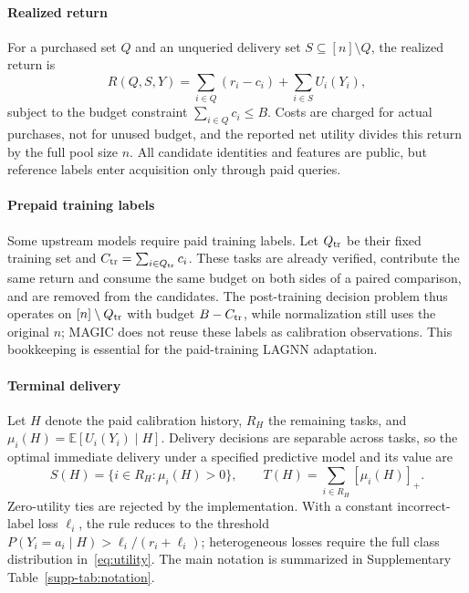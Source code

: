 \documentclass[journal]{IEEEtran}
\newcommand{\E}{\mathbb{E}}
\newcommand{\pos}[1]{[#1]_+}
\begin{document}
\paragraph{Realized return}
For a purchased set $Q$ and an unqueried delivery set $S\subseteq[n]\setminus Q$, the realized return is
\begin{equation}
 R(Q,S,Y)=\sum_{i\in Q}(r_i-c_i)+\sum_{i\in S}U_i(Y_i),
 \label{eq:return}
\end{equation}
subject to the budget constraint $\sum_{i\in Q}c_i\le B$. Costs are charged for actual purchases, not for unused budget, and the reported net utility divides this return by the full pool size $n$. All candidate identities and features are public, but reference labels enter acquisition only through paid queries.

\paragraph{Prepaid training labels}
Some upstream models require paid training labels. Let $Q_{\rm tr}$ be their fixed training set and $C_{\rm tr}=\sum_{i\in Q_{\rm tr}}c_i$. These tasks are already verified, contribute the same return and consume the same budget on both sides of a paired comparison, and are removed from the candidates. The post-training decision problem thus operates on $[n]\setminus Q_{\rm tr}$ with budget $B-C_{\rm tr}$, while normalization still uses the original $n$; MAGIC does not reuse these labels as calibration observations. This bookkeeping is essential for the paid-training LAGNN adaptation.

\paragraph{Terminal delivery}
Let $H$ denote the paid calibration history, $R_H$ the remaining tasks, and $\mu_i(H)=\E[U_i(Y_i)\mid H]$. Delivery decisions are separable across tasks, so the optimal immediate delivery under a specified predictive model and its value are
\begin{equation}
 S(H)=\{i\in R_H:\mu_i(H)>0\},\qquad
 T(H)=\sum_{i\in R_H}\pos{\mu_i(H)}.
 \label{eq:terminal}
\end{equation}
Zero-utility ties are rejected by the implementation. With a constant incorrect-label loss $\ell_i$, the rule reduces to the threshold $P(Y_i=a_i\mid H)>\ell_i/(r_i+\ell_i)$; heterogeneous losses require the full class distribution in~\eqref{eq:utility}. The main notation is summarized in Supplementary Table~\ref{supp-tab:notation}.
\end{document}
